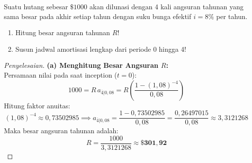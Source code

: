 \documentclass[11pt,a4paper]{article}
\begin{document}
\begin{examplebox}
Suatu hutang sebesar $\$1000$ akan dilunasi dengan 4 kali angsuran tahunan yang sama besar pada akhir setiap tahun dengan suku bunga efektif $i = 8\%$ per tahun.
\begin{enumerate}[label=(\alph*)]
    \item Hitung besar angsuran tahunan $R$!
    \item Susun jadwal amortisasi lengkap dari periode 0 hingga 4!
\end{enumerate}
\end{examplebox}

\begin{proof}[Penyelesaian]
\noindent\textbf{(a) Menghitung Besar Angsuran $R$:}\\[0.3em]
Persamaan nilai pada saat inception ($t=0$):
\begin{equation*}
    1000 = R \, a_{\overline{4}|0{,}08} = R \left( \frac{1 - (1{,}08)^{-4}}{0{,}08} \right)
\end{equation*}
Hitung faktor anuitas:
\begin{equation*}
    (1{,}08)^{-4} \approx 0{,}73502985 \implies a_{\overline{4}|0{,}08} = \frac{1 - 0{,}73502985}{0{,}08} = \frac{0{,}26497015}{0{,}08} \approx 3{,}3121268
\end{equation*}
Maka besar angsuran tahunan adalah:
\begin{equation*}
    R = \frac{1000}{3{,}3121268} \approx \mathbf{\$301{,}92}
\end{equation*}


\end{proof}
\end{document}
